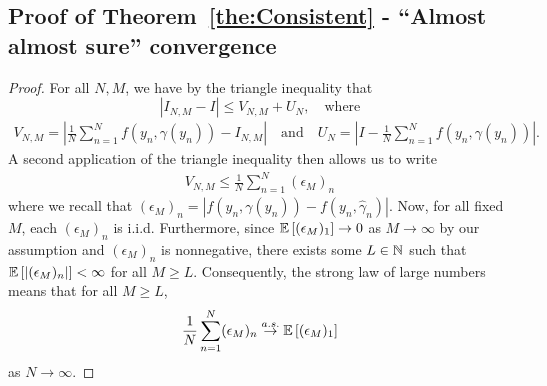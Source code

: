 
\subsection{Proof of Theorem~\ref{the:Consistent} - ``Almost almost sure'' convergence}
\label{sec:app:consistent}

\theConsistent*

\begin{proof}
	For all $N, M$, we have by the triangle inequality that
	\[
	\left|I_{N,M} - I\right| \leq V_{N,M} + U_N, \quad \text{where}
	\]
	\begin{eqnarray*}
		V_{N,M} = \left|\frac{1}{N} \sum_{n=1}^N f(y_n, \gamma(y_n)) - I_{N,M} \right| 
		\quad \text{and} \quad
		U_N = \left|I - \frac{1}{N} \sum_{n=1}^N f(y_n, \gamma(y_n)) \right|.
	\end{eqnarray*}
	A second application of the triangle inequality then allows us to write
	\begin{align} \label{eq:vnm}
    V_{N,M} \leq \frac{1}{N} \sum_{n=1}^N (\epsilon_M)_n
	\end{align}
	where we recall that $(\epsilon_M)_n = |f(y_n, \gamma(y_n)) - f(y_n, \hat{\gamma}_n)|$.
	Now, for all fixed $M$, each $(\epsilon_M)_n$ is i.i.d. Furthermore, since
        $\mathbb{E}
	\left[(\epsilon_M)_1\right] \to 0$ as $M \to \infty$ by our assumption and 
	$(\epsilon_M)_n$ is nonnegative, there exists some $L \in \mathbb{N}$
	such that $\mathbb{E}\left[\left|(\epsilon_M)_n \right|\right] < \infty$ for all $M \geq L$.
	Consequently, the strong law of large numbers means that for all $M \geq L$,
	\[ 
	\frac{1}{N} \sum_{n=1}^N (\epsilon_M)_n \overset{a.s.}{\to} \mathbb{E}\left[(\epsilon_M)_1\right]
	\] 
	as $N \to \infty$. 
        

\end{proof}
